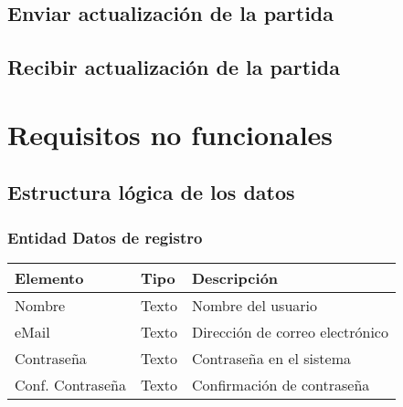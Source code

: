 \subsection{Enviar actualización de la partida}

\subsection{Recibir actualización de la partida}

\section{Requisitos no funcionales}

\subsection{Estructura lógica de los datos}

\subsubsection{Entidad Datos de registro}
\begin{tabularx}{0.9\textwidth}{llX}
\hline
\textbf{Elemento} & \textbf{Tipo} & \textbf{Descripción} \\
\hline
Nombre & Texto & Nombre del usuario \\
eMail & Texto & Dirección de correo electrónico \\
Contraseña & Texto & Contraseña en el sistema \\
Conf. Contraseña & Texto & Confirmación de contraseña \\
\hline
\end{tabularx}


